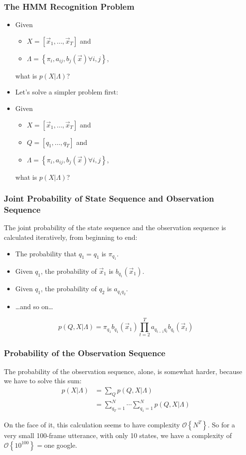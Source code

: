 \documentclass{beamer}
\begin{document}
\begin{frame}
  \frametitle{The HMM Recognition Problem}

  \begin{itemize}
  \item Given \begin{itemize} \item $X = [\vec{x}_1,\ldots,\vec{x}_T]$ and
    \item $\Lambda=\left\{\pi_i,a_{ij},b_j(\vec{x})\forall i,j\right\}$,\end{itemize} what is $p(X|\Lambda)$?
  \item Let's solve a simpler problem first:
  \item Given \begin{itemize}\item $X = [\vec{x}_1,\ldots,\vec{x}_T]$ and
    \item $Q = [q_1,\ldots,q_T]$ and
    \item $\Lambda=\left\{\pi_i,a_{ij},b_j(\vec{x})\forall i,j\right\}$,\end{itemize} what is $p(X|\Lambda)$?
  \end{itemize}
\end{frame}
  
\begin{frame}
  \frametitle{Joint Probability of State Sequence and Observation Sequence}

  The joint probability of the state sequence and the observation
  sequence is calculated iteratively, from beginning to end:
  \begin{itemize}
  \item The probability that $q_1=q_1$ is $\pi_{q_1}$.
  \item Given $q_1$, the probability of $\vec{x}_1$ is $b_{q_1}(\vec{x}_1)$.
  \item Given $q_1$, the probability of $q_2$ is $a_{q_1q_2}$.
  \item \ldots and so on\ldots
  \end{itemize}
  \[
  p(Q,X|\Lambda)=\pi_{q_1}b_{q_1}(\vec{x}_1)\prod_{t=2}^T a_{q_{t-1}q_t}b_{q_t}(\vec{x}_t)
  \]
\end{frame}

\begin{frame}
  \frametitle{Probability of the Observation Sequence}

  The probability of the observation sequence, alone, is somewhat
  harder, because we have to solve this sum:
  \begin{align*}
    p(X|\Lambda) &= \sum_{Q} p(Q,X|\Lambda)\\
    &= \sum_{q_T=1}^N\cdots\sum_{q_1=1}^N p(Q,X|\Lambda)
  \end{align*}

  On the face of it, this calculation seems to have complexity
  ${\mathcal O}\left\{N^T\right\}$.  So for a very small 100-frame
  utterance, with only 10 states, we have a complexity of ${\mathcal
    O}\left\{10^{100}\right\}=$one google.
\end{frame}
\end{document}
